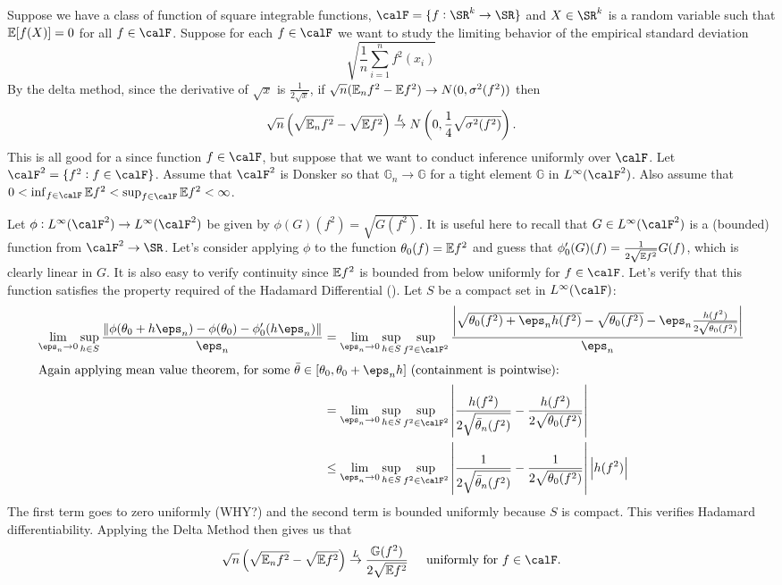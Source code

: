\begin{example}
	\label{ex:uniform-variance-delta-method}
	Suppose we have a class of function of square integrable functions, \(\calF=\{f:\SR^k\to \SR\}\) and \(X\in \SR^k\) is a random variable such that \(\mathbb{E}[f(X)]=0\) for all \(f\in\calF\). Suppose for each \(f\in\calF\) we want to study the limiting behavior of the empirical standard deviation \[\sqrt{\frac{1}{n}\sum_{i=1}^n f^2(x_i)}\]
	By the delta method, since the derivative of \(\sqrt{x}\) is \(\frac{1}{2\sqrt{x}}\), if \(\sqrt{n}(\mathbb{E}_n f^2 -\mathbb{E} f^2)\to N(0,\sigma^2(f^2))\) then
	\[
		\sqrt{n}\left(\sqrt{\mathbb{E}_n f^2}-\sqrt{\mathbb{E} f^2}\right)\overset{L}{\to} N\left(0, \frac{1}{4}\sqrt{\sigma^2(f^2)}\right)	
	.\] 
	This is all good for a since function \(f\in \calF\), but suppose that we want to conduct inference uniformly over \(\calF\).  Let \(\calF^2 = \{f^2 : f\in\calF\}\). Assume that \(\calF^2\) is Donsker so that  \(\mathbb{G}_n\to\mathbb{G}\) for a tight element \(\mathbb{G}\) in \(L^\infty(\calF^2)\).  Also assume that \(0 < \inf_{f\in\calF}\E f^2<\sup_{f\in\calF}\E f^2<\infty\). 

	Let \(\phi:L^\infty(\calF^2)\to L^\infty(\calF^2)\) be given by \(\phi(G)(f^2) = \sqrt{G(f^2)}\). It is useful here to recall that \(G \in L^\infty(\calF^2)\) is a (bounded) function from  \(\calF^2\to\SR\). Let's consider applying \(\phi\) to the function  \(\theta_0(f)=\mathbb{E} f^2\) and guess that \(\phi_0'(G)(f) = \frac{1}{2\sqrt{\mathbb{E} f^2}}G(f)\), which is clearly linear in \(G\). It is also easy to verify continuity since \(\mathbb{E} f^2\) is bounded from below uniformly for \(f\in\calF\). Let's verify that this function satisfies the property required of the Hadamard Differential (). Let \(S\) be a compact set in  \(L^\infty(\calF)\):
	\begin{align*}
		\lim_{\eps_n\to 0}\sup_{h \in S}\frac{\|\phi(\theta_0+h\eps_n)-\phi(\theta_0)-\phi_0'(h\eps_n)\|}{\eps_n} 
		&= \lim_{\eps_n\to 0}\sup_{h\in S} \sup_{f^2\in\calF^2}\frac{ \left|\sqrt{\theta_0(f^2)+\eps_nh(f^2)}-\sqrt{\theta_0(f^2)} - \eps_n\frac{h(f^2)}{2\sqrt{\theta_0(f^2)}} \right|}{\eps_n} \\
		\intertext{Again applying mean value theorem, for some \(\bar\theta \in [\theta_0, \theta_0+\eps_n h]\) (containment is pointwise):} 
		&= \lim_{\eps_n\to0}\sup_{h\in S}\sup_{f^2 \in \calF^2} \left|\frac{h(f^2)}{2\sqrt{\bar\theta_n(f^2)}} - \frac{h(f^2)}{2\sqrt{\theta_0(f^2)}}  \right| \\
		&\leq \lim_{\eps_n\to 0}\sup_{h\in S}\sup_{f^2\in\calF^2}\left|\frac{1}{2\sqrt{\bar\theta_n(f^2)}}-\frac{1}{2\sqrt{\theta_0(f^2)}}\right|\left|h(f^2)\right|
	\end{align*}
	The first term goes to zero uniformly (WHY?) and the second term is bounded uniformly because \(S\) is compact. This verifies Hadamard differentiability. Applying the Delta Method then gives us that 
	\[
		\sqrt{n}\left(\sqrt{\E_n f^2}-\sqrt{\E f^2}\right)\overset{L}{\to} \frac{\mathbb{G}(f^2)}{2\sqrt{\E f^2}}\;\;\;\;\text{ uniformly for \(f\in\calF\)}
	.\]
\end{example}

